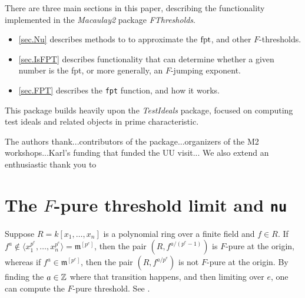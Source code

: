 \documentclass{amsart}
\newcommand{\fram}{\mathfrak{m}}
\begin{document}
There are three main sections in this paper, describing the functionality implemented in the \emph{Macaulay2} package \emph{FThresholds}. 
\begin{itemize}
\item{} \autoref{sec.Nu} describes methods to to approximate the $\operatorname{{fpt}}$, and other $F$-thresholds.  
\item{} \autoref{sec.IsFPT} describes functionality that can determine whether a given number is the fpt, or more generally, an $F$-jumping exponent.
\item{} \autoref{sec.FPT} describes the {\tt fpt} function, and how it works.
\end{itemize}

This package builds heavily upon the \emph{TestIdeals} package, focused on computing test ideals and related objects in prime characteristic.  

  The authors thank...contributors of the package...organizers of the M2 workshops...Karl's funding that funded the UU visit...  We also extend an enthusiastic thank you to 

\section{The $F$-pure threshold limit and {\tt nu}}
\label{sec.Nu}

Suppose $R = k[x_1, \dots, x_n]$ is a polynomial ring over a finite field and $f \in R$.    If $f^a \notin \langle x_1^{p^e}, \dots, x_n^{p^e} \rangle = \fram^{[p^e]}$, then the pair $(R, f^{a/(p^e -1)})$ is $F$-pure at the origin, whereas if $f^a \in \fram^{[p^e]}$, then the pair $(R, f^{a/p^e})$ is not $F$-pure at the origin.  By finding the $a \in \mathbb{Z}$ where that transition happens, and then limiting over $e$, one can compute the $F$-pure threshold.  See \cite{MustataTakagiWatanabeFThresholdsAndBernsteinSato}.
\end{document}
